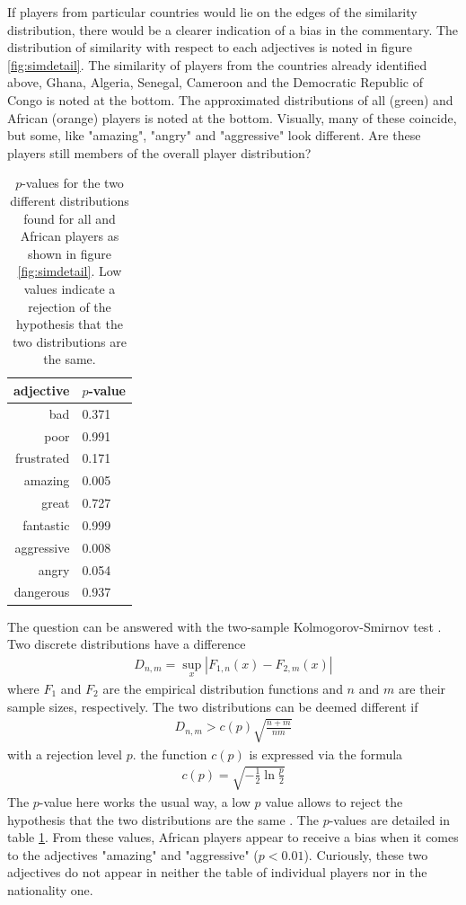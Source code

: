 \documentclass[10pt, a4paper]{UUThesisTemplate}
\begin{document}
If players from particular countries would lie on the edges of the similarity distribution, there would be a clearer indication of a bias in the commentary. The distribution of similarity with respect to each adjectives is noted in figure \ref{fig:simdetail}. The similarity of players from the countries already identified above, Ghana, Algeria, Senegal, Cameroon and the Democratic Republic of Congo is noted at the bottom. The approximated distributions of all (green) and African (orange) players is noted at the bottom. Visually, many of these coincide, but some, like "amazing", "angry" and "aggressive" look different. Are these players still members of the overall player distribution?

\begin{table}\centering
\small
\begin{tabular}{r l}
adjective & $p$-value\\\hline
bad & 0.371\\
poor & 0.991\\
frustrated & 0.171\\
amazing & 0.005\\
great & 0.727\\
fantastic & 0.999\\
aggressive & 0.008\\
angry & 0.054\\
dangerous & 0.937\\\hline
\end{tabular}
\caption{$p$-values for the two different distributions found for all and African players as shown in figure \ref{fig:simdetail}. Low values indicate a rejection of the hypothesis that the two distributions are the same.}\label{tab:calpha}
\end{table}

The question can be answered with the two-sample Kolmogorov-Smirnov test \cite{kstest}. Two discrete distributions have a difference
\begin{align}
D_{n,m} = \sup_x \left|F_{1, n}(x) - F_{2, m}(x)\right|
\end{align}
where $F_1$ and $F_2$ are the empirical distribution functions and $n$ and $m$ are their sample sizes, respectively. The two distributions can be deemed different if 
\begin{align}
D_{n,m} > c(p) \sqrt{\frac{n + m}{nm}}
\end{align}
with a rejection level $p$. the function $c(p)$ is expressed via the formula
\begin{align}
c(p) = \sqrt{-\frac12 \ln \frac p2}
\end{align}
The $p$-value here works the usual way, a low $p$ value allows to reject the hypothesis that the two distributions are the same \cite{kscritical}. The $p$-values are detailed in table \ref{tab:calpha}. From these values, African players appear to receive a bias when it comes to the adjectives "amazing" and "aggressive" ($p<0.01$). Curiously, these two adjectives do not appear in neither the table of individual players nor in the nationality one.
\end{document}
